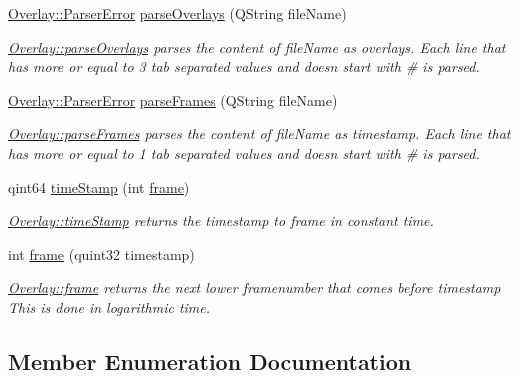 \begin{DoxyCompactItemize}
\hyperlink{classOverlay_a9ef00f03a1372dc5bf0ae9b399c18193}{Overlay\+::\+Parser\+Error} \hyperlink{classOverlay_add3d9864ecc33df3f599e163c11fcb6d}{parse\+Overlays} (Q\+String file\+Name)
\begin{DoxyCompactList}\small\item\em \hyperlink{classOverlay_add3d9864ecc33df3f599e163c11fcb6d}{Overlay\+::parse\+Overlays} parses the content of file\+Name as overlays. Each line that has more or equal to 3 tab separated values and doesn start with \textquotesingle{}\#\textquotesingle{} is parsed. \end{DoxyCompactList}\item 
\hyperlink{classOverlay_a9ef00f03a1372dc5bf0ae9b399c18193}{Overlay\+::\+Parser\+Error} \hyperlink{classOverlay_ac7f1e54f1d27a7ad0c7991dd8afb88f4}{parse\+Frames} (Q\+String file\+Name)
\begin{DoxyCompactList}\small\item\em \hyperlink{classOverlay_ac7f1e54f1d27a7ad0c7991dd8afb88f4}{Overlay\+::parse\+Frames} parses the content of file\+Name as timestamp. Each line that has more or equal to 1 tab separated values and doesn start with \textquotesingle{}\#\textquotesingle{} is parsed. \end{DoxyCompactList}\item 
qint64 \hyperlink{classOverlay_aba30f4cadbcfead2b1b44915617f0d32}{time\+Stamp} (int \hyperlink{classOverlay_a39d037dcbfcdc8f2aaa39951bcd9acfc}{frame})
\begin{DoxyCompactList}\small\item\em \hyperlink{classOverlay_aba30f4cadbcfead2b1b44915617f0d32}{Overlay\+::time\+Stamp} returns the timestamp to frame in constant time. \end{DoxyCompactList}\item 
int \hyperlink{classOverlay_a39d037dcbfcdc8f2aaa39951bcd9acfc}{frame} (quint32 timestamp)
\begin{DoxyCompactList}\small\item\em \hyperlink{classOverlay_a39d037dcbfcdc8f2aaa39951bcd9acfc}{Overlay\+::frame} returns the next lower framenumber that comes before timestamp This is done in logarithmic time. \end{DoxyCompactList}\end{DoxyCompactItemize}


\subsection{Member Enumeration Documentation}
